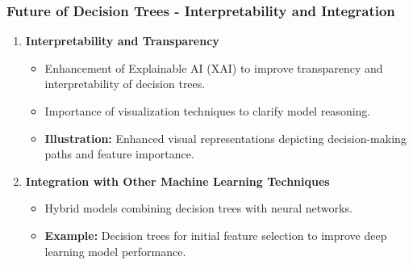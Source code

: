 \documentclass[aspectratio=169]{beamer}
\begin{document}
\begin{frame}[fragile]
    \frametitle{Future of Decision Trees - Interpretability and Integration}
    \begin{enumerate}
        \item \textbf{Interpretability and Transparency}
            \begin{itemize}
                \item Enhancement of Explainable AI (XAI) to improve transparency and interpretability of decision trees.
                \item Importance of visualization techniques to clarify model reasoning.
                \item \textbf{Illustration:} Enhanced visual representations depicting decision-making paths and feature importance.
            \end{itemize}
        
        \item \textbf{Integration with Other Machine Learning Techniques}
            \begin{itemize}
                \item Hybrid models combining decision trees with neural networks.
                \item \textbf{Example:} Decision trees for initial feature selection to improve deep learning model performance.
            \end{itemize}
    \end{enumerate}
\end{frame}
\end{document}
